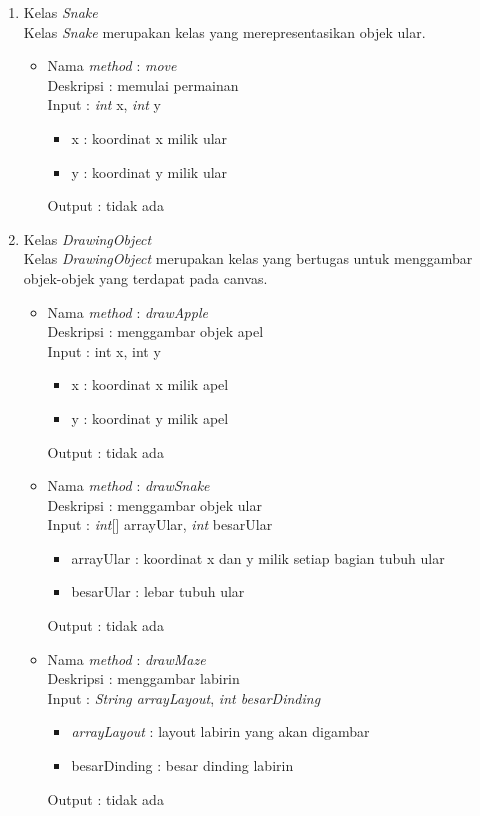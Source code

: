\begin{enumerate}
	\item Kelas \textit{Snake}\\
	Kelas \textit{Snake} merupakan kelas yang merepresentasikan objek ular.
		
		\begin{itemize}
			\item Nama \textit{method} : \textit{move}\\
				  Deskripsi : memulai permainan\\
				  Input : \textit{int} x, \textit{int} y
				  	\begin{itemize}
				  		\item x : koordinat x milik ular
				  		\item y : koordinat y milik ular
				  	\end{itemize}
				  Output : tidak ada\\
		\end{itemize}
		
	\item Kelas \textit{DrawingObject}\\
	Kelas \textit{DrawingObject} merupakan kelas yang bertugas untuk menggambar objek-objek yang terdapat pada canvas.
	
		\begin{itemize}
			\item Nama \textit{method} : \textit{drawApple}\\
				  Deskripsi : menggambar objek apel\\
				  Input : int x, int y
				  	\begin{itemize}
				  		\item x : koordinat x milik apel
				  		\item y : koordinat y milik apel
				  	\end{itemize}
				  Output : tidak ada\\
			\item Nama \textit{method} : \textit{drawSnake}\\
				  Deskripsi : menggambar objek ular\\
				  Input : \textit{int}[] arrayUlar, \textit{int} besarUlar
				  	\begin{itemize}
				  		\item arrayUlar : koordinat x dan y milik setiap bagian tubuh ular
				  		\item besarUlar : lebar tubuh ular
				  	\end{itemize}
				  Output : tidak ada\\
			\item Nama \textit{method} : \textit{drawMaze}\\
				  Deskripsi : menggambar labirin\\
				  Input : \textit{String arrayLayout}, \textit{int besarDinding}
				  	\begin{itemize}
				  		\item \textit{arrayLayout} : layout labirin yang akan digambar
				  		\item besarDinding : besar dinding labirin
				  	\end{itemize}
				  Output : tidak ada\\
		\end{itemize}
		

\end{enumerate}
